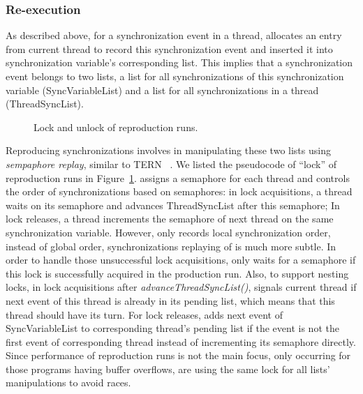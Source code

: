  
\subsubsection{Re-execution}
As described above, for a synchronization event in a thread,
\doubletake{} allocates an entry from current thread to record this synchronization event 
and inserted it into synchronization variable's corresponding list. 
This implies that a synchronization event belongs to two lists, 
a list for all synchronizations of this synchronization variable (SyncVariableList) and 
a list for all synchronizations in a thread (ThreadSyncList). 

\begin{figure}[!ht]
{\centering
\subfigure{}
\caption{Lock and unlock of reproduction runs. \label{fig:lockunlock}}
}
\end{figure}

Reproducing synchronizations involves in manipulating these two lists using 
{\it sempaphore replay}, similar to TERN ~\cite{TERN}.
We listed the pseudocode of ``lock'' of reproduction runs in Figure~\ref{fig:lockunlock}.
\doubletake{} assigns a semaphore for each thread and controls the order 
of synchronizations based on semaphores: in lock acquisitions, 
a thread waits on its semaphore and advances ThreadSyncList after this semaphore; 
In lock releases, a thread increments the semaphore of next thread on the same 
synchronization variable.
However, \doubletake{} only records local synchronization order, instead of global order,
synchronizations replaying of \doubletake{} is much more subtle.
In order to handle those unsuccessful lock acquisitions, \doubletake{} only waits for a semaphore 
if this lock is successfully acquired in the production run. 
Also, to support nesting locks, in lock acquisitions after {\it advanceThreadSyncList()}, 
\doubletake{} signals current thread if next event of this thread is already 
in its pending list, which means that this thread should have its turn.
For lock releases, \doubletake{} adds next event of SyncVariableList to corresponding thread's 
pending list if the event is not the first event of corresponding thread instead of incrementing
its semaphore directly. 
Since performance of reproduction runs is not the main focus, only occurring for those programs 
having buffer overflows, \doubletake{} are using the same lock for all lists' manipulations to
avoid races.  



